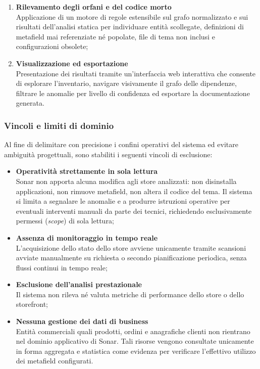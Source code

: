 \begin{enumerate}
    \item \textbf{Rilevamento degli orfani e del codice morto}\\
    Applicazione di un motore di regole estensibile sul grafo normalizzato e sui risultati dell'analisi statica per individuare entità scollegate, definizioni di metafield mai referenziate né popolate, file di tema non inclusi e configurazioni obsolete;
    \item \textbf{Visualizzazione ed esportazione}\\
    Presentazione dei risultati tramite un'interfaccia web interattiva che consente di esplorare l'inventario, navigare visivamente il grafo delle dipendenze, filtrare le anomalie per livello di confidenza ed esportare la documentazione generata.
\end{enumerate}

\subsubsection{Vincoli e limiti di dominio}
Al fine di delimitare con precisione i confini operativi del sistema ed evitare ambiguità progettuali, sono stabiliti i seguenti vincoli di esclusione:
\begin{itemize}
    \item \textbf{Operatività strettamente in sola lettura}\\
    Sonar non apporta alcuna modifica agli store analizzati: non disinstalla applicazioni, non rimuove metafield, non altera il codice del tema. Il sistema si limita a segnalare le anomalie e a produrre istruzioni operative per eventuali interventi manuali da parte dei tecnici, richiedendo esclusivamente permessi (\textit{scope}) di sola lettura;
    \item \textbf{Assenza di monitoraggio in tempo reale}\\
    L'acquisizione dello stato dello store avviene unicamente tramite scansioni avviate manualmente su richiesta o secondo pianificazione periodica, senza flussi continui in tempo reale;
    \item \textbf{Esclusione dell'analisi prestazionale}\\
    Il sistema non rileva né valuta metriche di performance dello store o dello storefront;
    \item \textbf{Nessuna gestione dei dati di business}\\
    Entità commerciali quali prodotti, ordini e anagrafiche clienti non rientrano nel dominio applicativo di Sonar. Tali risorse vengono consultate unicamente in forma aggregata e statistica come evidenza per verificare l'effettivo utilizzo dei metafield configurati.
\end{itemize}


